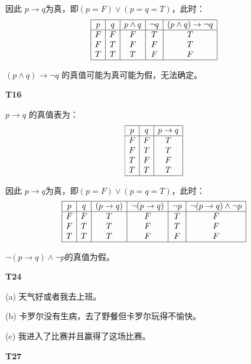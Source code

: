 \documentclass{article}
\begin{document}
因此 $p \rightarrow q$为真，即$(p = F) \lor (p = q = T)$，此时：
\[
\begin{array}{|c|c|c|c|c|}
    \hline
    p & q & p \land q & \lnot q & (p \land q) \rightarrow \lnot q\\
    \hline
    F & F & F & T & T\\
    F & T & F & F & T\\
    T & T & T & F & F\\
    \hline
\end{array}
\]

$(p \land q) \rightarrow \lnot q$ 的真值可能为真可能为假，无法确定。

\vspace{10pt}

\textbf{T16}

$p \rightarrow q$ 的真值表为：\[
\begin{array}{|c|c|c|}
    \hline
    p & q & p \rightarrow q\\
    \hline
    F & F & T\\
    F & T & T\\
    T & F & F\\
    T & T & T\\
    \hline    
\end{array}
\]

因此 $p \rightarrow q$为真，即$(p = F) \lor (p = q = T)$，此时：
\[
\begin{array}{|c|c|c|c|c|c|}
    \hline
    p & q & (p \rightarrow q) & \lnot (p \rightarrow q) & \lnot p & \lnot (p \rightarrow q) \land \lnot p\\
    \hline
    F & F & T & F & T & F\\
    F & T & T & F & T & F\\
    T & T & T & F & F & F\\
    \hline
\end{array}
\]

$\lnot (p \rightarrow q) \land \lnot p$的真值为假。

\vspace{10pt}

\textbf{T24}

(a) 天气好或者我去上班。

(b) 卡罗尔没有生病，去了野餐但卡罗尔玩得不愉快。

(c) 我进入了比赛并且赢得了这场比赛。

\vspace{10pt}

\textbf{T27}
\end{document}
